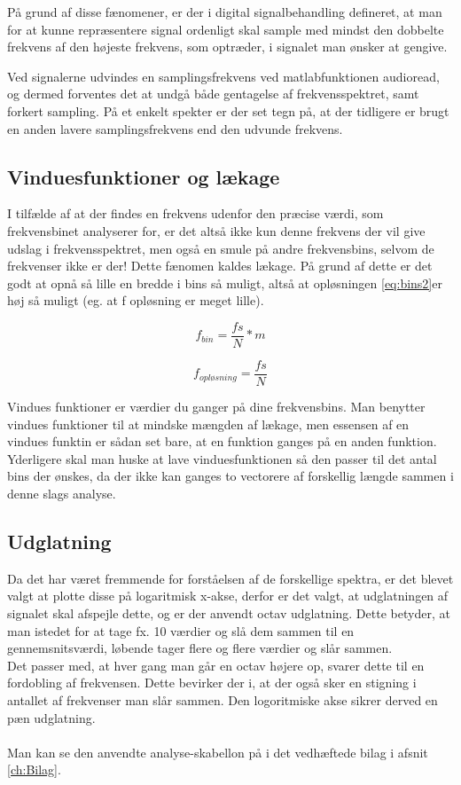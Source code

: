  På grund af disse fænomener, er der i digital signalbehandling defineret, at man for at kunne repræsentere signal ordenligt skal sample med mindst den dobbelte frekvens af den højeste frekvens, som optræder, i signalet man ønsker at gengive. 
 
  Ved signalerne udvindes en samplingsfrekvens ved matlabfunktionen audioread, og dermed forventes det at undgå både gentagelse af frekvensspektret, samt forkert sampling. På et enkelt spekter er der set tegn på, at der tidligere er brugt en anden lavere samplingsfrekvens end den udvunde frekvens.

\subsection{Vinduesfunktioner og lækage}
 I tilfælde af at der findes en frekvens udenfor den præcise værdi, som frekvensbinet analyserer for, er det altså ikke kun denne frekvens der vil give udslag i frekvensspektret, men også en smule på andre frekvensbins, selvom de frekvenser ikke er der! Dette fænomen kaldes lækage. På grund af dette er det godt at opnå så lille en bredde i bins så muligt, altså at opløsningen \eqref{eq:bins2}er høj så muligt (eg. at f opløsning er meget lille).  

 \begin{equation}\label{eq:bins}
 f_{bin} = \frac{fs}{N}*m 
 \end{equation}

\begin{equation}\label{eq:bins}
f_{opløsning} = \frac{fs}{N} 
\end{equation}

Vindues funktioner er værdier du ganger på dine frekvensbins. Man benytter vindues funktioner til at mindske mængden af lækage, men essensen af en vindues funktin er sådan set bare, at en funktion ganges på en anden funktion. Yderligere skal man huske at lave vinduesfunktionen så den passer til det antal bins der ønskes, da der ikke kan ganges to vectorere af forskellig længde sammen i denne slags analyse.

\subsection{Udglatning}

Da det har været fremmende for forståelsen af de forskellige spektra, er det blevet valgt at plotte disse på logaritmisk x-akse, derfor er det valgt, at udglatningen af signalet skal afspejle dette, og er der anvendt octav udglatning. Dette betyder, at man istedet for at tage fx. 10 værdier og slå dem sammen til en gennemsnitsværdi, løbende tager flere og flere værdier og slår sammen. \\Det passer med, at hver gang man går en octav højere op, svarer dette til en fordobling af frekvensen. Dette bevirker der i, at der også sker en stigning i antallet af frekvenser man slår sammen. Den logoritmiske akse sikrer derved en pæn udglatning.
\\\\
Man kan se den anvendte analyse-skabellon på i det vedhæftede bilag i afsnit \ref{ch:Bilag}.



